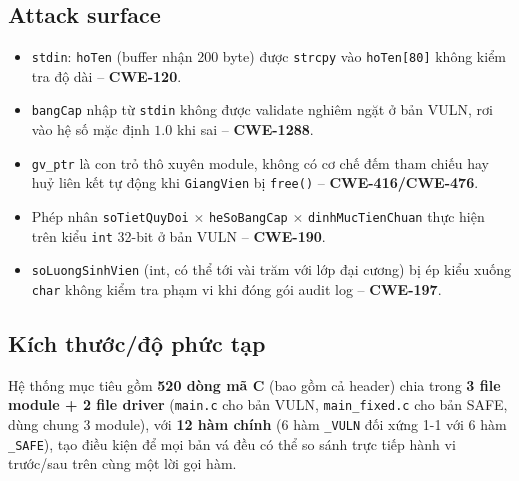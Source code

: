 \subsection{Attack surface}

\begin{itemize}
  \item \texttt{stdin}: \texttt{hoTen} (buffer nhận 200 byte) được \texttt{strcpy} vào \texttt{hoTen[80]} không kiểm tra độ dài -- \textbf{CWE-120}.
  \item \texttt{bangCap} nhập từ \texttt{stdin} không được validate nghiêm ngặt ở bản VULN, rơi vào hệ số mặc định $1.0$ khi sai -- \textbf{CWE-1288}.
  \item \texttt{gv\_ptr} là con trỏ thô xuyên module, không có cơ chế đếm tham chiếu hay huỷ liên kết tự động khi \texttt{GiangVien} bị \texttt{free()} -- \textbf{CWE-416/CWE-476}.
  \item Phép nhân \texttt{soTietQuyDoi} $\times$ \texttt{heSoBangCap} $\times$ \texttt{dinhMucTienChuan} thực hiện trên kiểu \texttt{int} 32-bit ở bản VULN -- \textbf{CWE-190}.
  \item \texttt{soLuongSinhVien} (int, có thể tới vài trăm với lớp đại cương) bị ép kiểu xuống \texttt{char} không kiểm tra phạm vi khi đóng gói audit log -- \textbf{CWE-197}.
\end{itemize}

\subsection{Kích thước/độ phức tạp}

Hệ thống mục tiêu gồm \textbf{520 dòng mã C} (bao gồm cả header) chia trong \textbf{3 file module + 2 file driver} (\texttt{main.c} cho bản VULN, \texttt{main\_fixed.c} cho bản SAFE, dùng chung 3 module), với \textbf{12 hàm chính} (6 hàm \texttt{\_VULN} đối xứng 1-1 với 6 hàm \texttt{\_SAFE}), tạo điều kiện để mọi bản vá đều có thể so sánh trực tiếp hành vi trước/sau trên cùng một lời gọi hàm.
